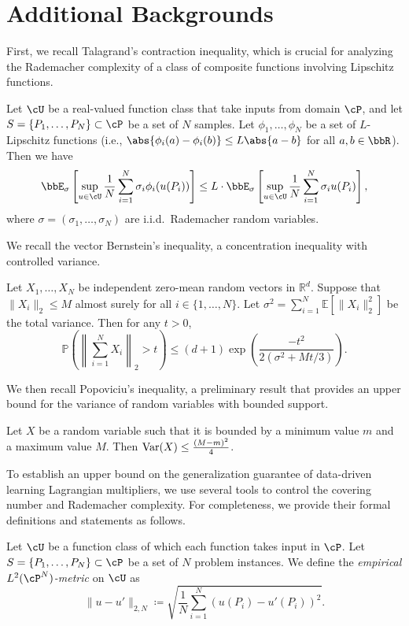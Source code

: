 \section{Additional Backgrounds} \label{apx:additional-backgrounds}
First, we recall Talagrand's contraction inequality, which is crucial for analyzing the Rademacher complexity of a class of composite functions involving Lipschitz functions. 
\begin{lemma} \label{lm:talagrand}
    Let $\cU$ be a real-valued function class that take inputs from domain $\cP$, and let $S = \{P_1, \dots, P_N\} \subset \cP$ be a set of $N$ samples. Let $\phi_1, \dots, \phi_N$ be a set of $L$-Lipschitz functions (i.e., $\abs{\phi_i(a) - \phi_i(b)} \leq L \abs{a - b}$ for all $a, b \in \bbR$). Then we have 
    \[
        \bbE_{\sigma}\left[\sup_{u \in \cU} \frac{1}{N}\sum_{i = 1}^N \sigma_i \phi_i(u(P_i))\right] \leq L \cdot \bbE_{\sigma} \left[\sup_{u \in \cU}\frac{1}{N}\sum_{i = 1}^N \sigma_i u(P_i)\right],
    \]
    where $\sigma = (\sigma_1, \dots, \sigma_N)$ are i.i.d.~Rademacher random variables. 
\end{lemma}

We recall the vector Bernstein's inequality, a concentration inequality with controlled variance. 
\begin{lemma} \label{lm:vector-bernstein}
    Let $X_1, \dots, X_N$ be independent zero-mean random vectors in $\mathbb{R}^d$. Suppose that $\|X_i\|_2 \le M$ almost surely for all $i \in \{1, \dots, N\}$. Let $\sigma^2 = \sum_{i=1}^N \mathbb{E}[\|X_i\|_2^2]$ be the total variance. Then for any $t > 0$,$$\mathbb{P}\left( \left\| \sum_{i=1}^N X_i \right\|_2 > t \right) \le (d+1) \exp\left( \frac{-t^2}{2(\sigma^2 + Mt/3)} \right).$$
\end{lemma}
We then recall Popoviciu's inequality, a preliminary result that provides an upper bound for the variance of random variables with bounded support. 

\begin{lemma} \label{lm:popoviciu}
    Let $X$ be a random variable such that it is bounded by a minimum value $m$ and a maximum value $M$. Then $\textup{Var}(X) \leq \frac{(M - m)^2}{4}$.
\end{lemma}

To establish an upper bound on the generalization guarantee of data-driven learning Lagrangian multipliers, we use several tools to control the covering number and Rademacher complexity. For completeness, we provide their formal definitions and statements as follows.
\begin{definition} \label{def:empirical-l2-pn-metric}
    Let $\cU$ be a function class of which each function takes input in $\cP$. Let $S = \{P_1, \dots, P_N\} \subset \cP$ be a set of $N$ problem instances. We define the \textit{empirical $L^2(\cP^N)$-metric} on $\cU$ as 
    \[
        \|u - u'\|_{2, N} \coloneqq \sqrt{\frac{1}{N}\sum_{i = 1}^N (u(P_i) - u'(P_i))^2}.
    \]
\end{definition}

